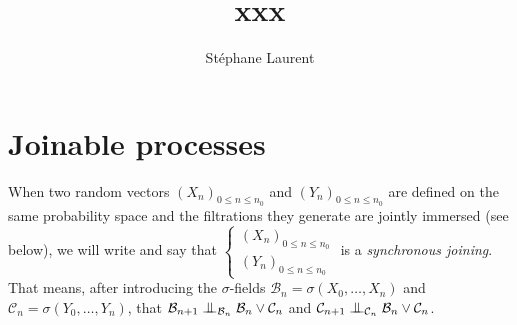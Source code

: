 \documentclass[12pt,a4paper]{article}
\author{Stéphane Laurent}
\title{xxx}
\begin{document}
\theoremstyle{defstyle}
\newtheorem{definition}{Definition}
\newtheorem{remark}{Remark}
\newtheorem{question}{Question}
\newtheorem{clarify}{To clarify}
\theoremstyle{thmstyle}
\newtheorem{thm}{Theorem}[section]
\newtheorem{ppsition}{Proposition}
\newtheorem{lemma}{Lemma}

\newcommand{\BB}{\mathcal{B}}
\newcommand{\CC}{\mathcal{C}}
\newcommand{\FF}{\mathcal{F}}
\newcommand{\GG}{\mathcal{G}}
\newcommand{\EE}{\mathbb{E}}
\newcommand{\EEE}{\mathcal{E}}
\newcommand{\HH}{\mathcal{H}}
\newcommand{\II}{\mathcal{I}}
\newcommand{\LL}{\mathcal{L}}
\newcommand{\OO}{\mathcal{O}}
\newcommand{\UU}{\mathcal{U}}
\newcommand{\XX}{\mathcal{X}}
\newcommand{\given}{\mid}
\newcommand{\eps}{\epsilon}
\newcommand{\indic}{\boldsymbol 1}
\newcommand{\Vb}{\boldsymbol V}
\newcommand{\tildV}{\widetilde{V}}
\newcommand{\tildX}{\widetilde{X}}
\newcommand{\tildeps}{\widetilde{\epsilon}}

\newcommand{\indvee}{\dot{\vee}}
\newcommand{\indep}{\mathrel{\text{\scalebox{1.07}{$\perp\mkern-10mu\perp$}}}}


\maketitle

\section{Joinable processes}

When two random vectors 
${(X_n)}_{0 \leq n \leq n_0}$ and ${(Y_n)}_{0 \leq n \leq n_0}$ are defined 
on the same probability space and the filtrations they generate are 
jointly immersed (see below), we will write and say that 
$\left\{\begin{smallmatrix} {(X_n)}_{0 \leq n \leq n_0} \\ 
{(Y_n)}_{0 \leq n \leq n_0}
\end{smallmatrix}\right.$  is a \emph{synchronous joining}. 
That means, after introducing the $\sigma$-fields 
$\BB_n = \sigma(X_{0}, \ldots, X_n)$ and  
$\CC_n = \sigma(Y_{0}, \ldots, Y_n)$, that 
$\BB_{n+1} \indep_{\BB_n} \BB_n \vee \CC_n$ 
and $\CC_{n+1} \indep_{\CC_n} \BB_n \vee \CC_n$.  
\end{document}
